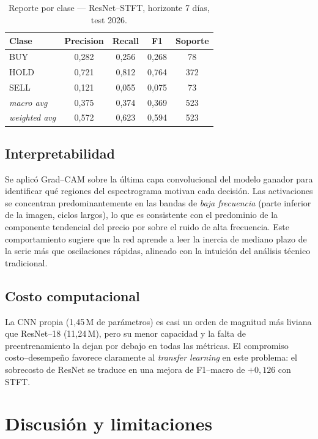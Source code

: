 \documentclass[conference]{IEEEtran}
\begin{document}
\begin{table}[t]
\caption{Reporte por clase --- ResNet--STFT, horizonte 7 días, test 2026.}
\label{tab:report}
\centering
\begin{tabular}{lcccc}
\toprule
\textbf{Clase} & \textbf{Precision} & \textbf{Recall} & \textbf{F1} & \textbf{Soporte} \\
\midrule
BUY  & 0,282 & 0,256 & 0,268 & 78 \\
HOLD & 0,721 & 0,812 & 0,764 & 372 \\
SELL & 0,121 & 0,055 & 0,075 & 73 \\
\midrule
\textit{macro avg}    & 0,375 & 0,374 & 0,369 & 523 \\
\textit{weighted avg} & 0,572 & 0,623 & 0,594 & 523 \\
\bottomrule
\end{tabular}
\end{table}

\subsection{Interpretabilidad}
Se aplicó Grad--CAM sobre la última capa convolucional del modelo ganador
para identificar qué regiones del espectrograma motivan cada decisión. Las
activaciones se concentran predominantemente en las bandas de \emph{baja
frecuencia} (parte inferior de la imagen, ciclos largos), lo que es
consistente con el predominio de la componente tendencial del precio por
sobre el ruido de alta frecuencia. Este comportamiento sugiere que la red
aprende a leer la inercia de mediano plazo de la serie más que oscilaciones
rápidas, alineado con la intuición del análisis técnico tradicional.

\subsection{Costo computacional}
La CNN propia (1,45\,M de parámetros) es casi un orden de magnitud más
liviana que ResNet--18 (11,24\,M), pero su menor capacidad y la falta de
preentrenamiento la dejan por debajo en todas las métricas. El compromiso
costo--desempeño favorece claramente al \emph{transfer learning} en este
problema: el sobrecosto de ResNet se traduce en una mejora de F1--macro de
$+0{,}126$ con STFT.

\section{Discusión y limitaciones}
\end{document}
